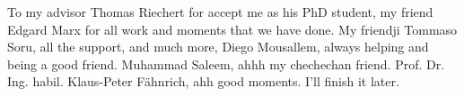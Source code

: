 To my advisor Thomas Riechert for accept me as his PhD student, my friend Edgard Marx for all work and moments that we have done. My friendji Tommaso Soru, all the support, and much more, Diego Mousallem, always helping and being a good friend. Muhammad Saleem, ahhh my chechechan friend. Prof. Dr. Ing. habil. Klaus-Peter Fähnrich, ahh good moments. I'll finish it later.